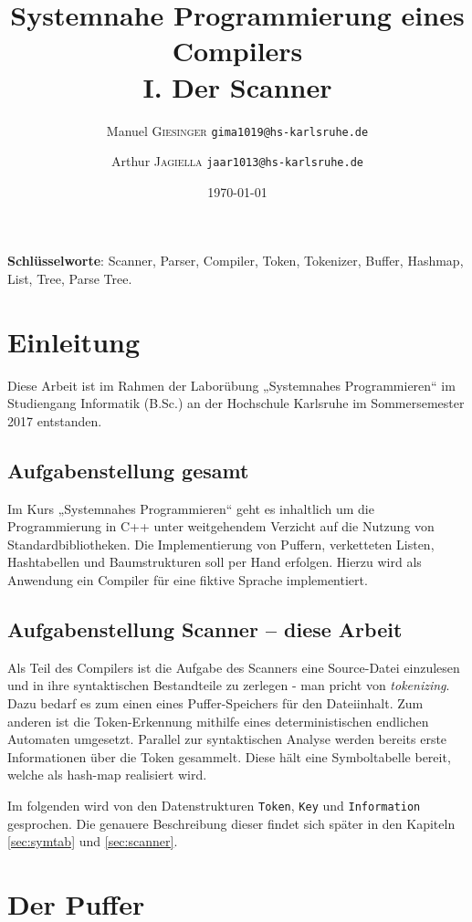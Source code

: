 \documentclass[
a4paper,   %
11pt,      %
oneside,   %
onecolumn, %
final      %
]{article}
\title{Systemnahe Programmierung eines Compilers\\I. Der Scanner}
\author{
Manuel \textsc{Giesinger} \hspace{1cm} \texttt{gima1019@hs-karlsruhe.de}
\and
Arthur \textsc{Jagiella} \hspace{1.35cm} \texttt{jaar1013@hs-karlsruhe.de}
}
\date{\today}
\newcommand{\code}[1]{\lstinline$#1$}
\begin{document}
\maketitle



\textbf{Schlüsselworte}: Scanner, Parser, Compiler, Token, Tokenizer, Buffer, Hashmap, List, Tree, Parse Tree.


\section{Einleitung} %
Diese Arbeit ist im Rahmen der Laborübung „Systemnahes Programmieren“ im Studiengang Informatik (B.Sc.) an der Hochschule Karlsruhe im Sommersemester 2017 entstanden. 

\subsection{Aufgabenstellung gesamt}
Im Kurs „Systemnahes Programmieren“ geht es inhaltlich um die Programmierung in C++ unter weitgehendem Verzicht auf die Nutzung von Standardbibliotheken. Die Implementierung von Puffern, verketteten Listen, Hashtabellen und Baumstrukturen soll per Hand erfolgen. Hierzu wird als Anwendung ein Compiler für eine fiktive Sprache implementiert.

\subsection{Aufgabenstellung Scanner -- diese Arbeit} 
Als Teil des Compilers ist die Aufgabe des Scanners eine Source-Datei einzulesen und in ihre syntaktischen Bestandteile zu zerlegen - man pricht von \emph{tokenizing}. Dazu bedarf es zum einen eines Puffer-Speichers für den Dateiinhalt. Zum anderen ist die Token-Erkennung mithilfe eines deterministischen endlichen Automaten umgesetzt.
Parallel zur syntaktischen Analyse werden bereits erste Informationen über die Token gesammelt. Diese hält eine Symboltabelle bereit, welche als hash-map realisiert wird.

Im folgenden wird von den Datenstrukturen \code{Token}, \code{Key} und \code{Information} gesprochen. Die genauere Beschreibung dieser findet sich später in den Kapiteln \ref{sec:symtab} und \ref{sec:scanner}.

\section{Der Puffer}
\end{document}
